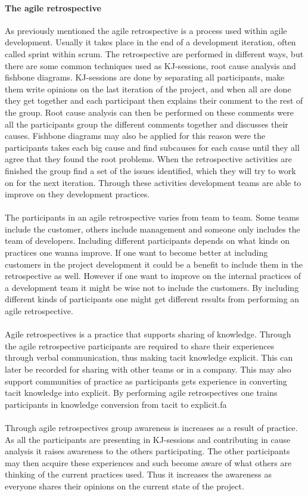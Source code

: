 \documentclass[12pt]{article}
\begin{document}
\paragraph{The agile retrospective}
As previously mentioned the agile retrospective is a process used within agile development. Usually it takes place in the end of a development iteration, often called sprint within scrum. The retrospective are performed in different ways, but there are some common techniques used as KJ-sessions, root cause analysis and fishbone diagrams. KJ-sessions are done by separating all participants, make them write opinions on the last iteration of the project, and when all are done they get together and each participant then explains their comment to the rest of the group. Root cause analysis can then be performed on these comments were all the participants group the different comments together and discusses their causes. Fishbone diagrams may also be applied for this reason were the participants takes each big cause and find subcauses for each cause until they all agree that they found the root problems. When the retrospective activities are finished the group find a set of the issues identified, which they will try to work on for the next iteration. Through these activities development teams are able to improve on they development practices. 
\\\\
The participants in an agile retrospective varies from team to team. Some teams include the customer, others include management and someone only includes the team of developers. Including different participants depends on what kinds on practices one wanna improve. If one want to become better at including customers in the project development it could be a benefit to include them in the retrospective as well. However if one want to improve on the internal practices of a development team it might be wise not to include the customers. By including different kinds of participants one might get different results from performing an agile retrospective. 
\\\\
Agile retrospectives is a practice that supports sharing of knowledge. Through the agile retrospective participants are required to share their experiences through verbal communication, thus making tacit knowledge explicit. This can later be recorded for sharing with other teams or in a company. This may also support communities of practice as participants gets experience in converting tacit knowledge into explicit. By performing agile retrospectives one trains participants in knowledge conversion from tacit to explicit.fa
\\\\
Through agile retrospectives group awareness is increases as a result of practice. As all the participants are presenting in KJ-sessions and contributing in cause analysis it raises awareness to the others participating. The other participants may then acquire these experiences and such become aware of what others are thinking of the current practices used. Thus it increases the awareness as everyone shares their opinions on the current state of the project.
 
\end{document}
